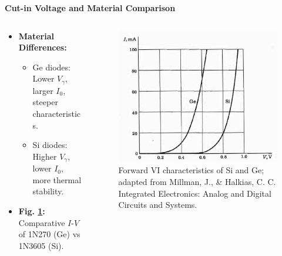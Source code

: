 \begin{frame}{\textbf{Cut-in Voltage and Material Comparison}}
	\begin{columns}
		\begin{column}{0.35\textwidth}
    \begin{itemize}
        \item \textbf{Material Differences:}
        \begin{itemize}
            \item Ge diodes: Lower $V_\gamma$, larger $I_0$, steeper characteristics.
            \item Si diodes: Higher $V_\gamma$, lower $I_0$, more thermal stability.
        \end{itemize}
        \item \textbf{Fig. \ref{fig:Si_Ge_diode_characteristics}:} Comparative $I$-$V$ of 1N270 (Ge) vs 1N3605 (Si).
    \end{itemize}
\end{column}
\begin{column}{0.65\textwidth}
	\begin{figure}
		\centering
		\includegraphics[scale=0.25]{fig/lec03/VI_character_Si_Ge.png}
		\caption{Forward VI characteristics of Si and Ge; adapted from Millman, J., \& Halkias, C. C. Integrated Electronics: Analog and Digital Circuits and Systems.}
		\label{fig:Si_Ge_diode_characteristics}
	\end{figure}
	\end{column}
	\end{columns}
\end{frame}

